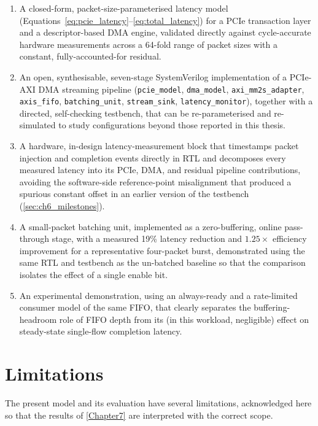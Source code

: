 \begin{enumerate}
    \item A closed-form, packet-size-parameterised latency model (Equations~\ref{eq:pcie_latency}--\ref{eq:total_latency}) for a PCIe transaction layer and a descriptor-based DMA engine, validated directly against cycle-accurate hardware measurements across a 64-fold range of packet sizes with a constant, fully-accounted-for residual.
    \item An open, synthesisable, seven-stage SystemVerilog implementation of a PCIe-AXI DMA streaming pipeline (\texttt{pcie\_model}, \texttt{dma\_model}, \texttt{axi\_mm2s\_adapter}, \texttt{axis\_fifo}, \texttt{batching\_unit}, \texttt{stream\_sink}, \texttt{latency\_monitor}), together with a directed, self-checking testbench, that can be re-parameterised and re-simulated to study configurations beyond those reported in this thesis.
    \item A hardware, in-design latency-measurement block that timestamps packet injection and completion events directly in RTL and decomposes every measured latency into its PCIe, DMA, and residual pipeline contributions, avoiding the software-side reference-point misalignment that produced a spurious constant offset in an earlier version of the testbench (\autoref{sec:ch6_milestones}).
    \item A small-packet batching unit, implemented as a zero-buffering, online pass-through stage, with a measured 19\% latency reduction and $1.25\times$ efficiency improvement for a representative four-packet burst, demonstrated using the same RTL and testbench as the un-batched baseline so that the comparison isolates the effect of a single enable bit.
    \item An experimental demonstration, using an always-ready and a rate-limited consumer model of the same FIFO, that clearly separates the buffering-headroom role of FIFO depth from its (in this workload, negligible) effect on steady-state single-flow completion latency.
\end{enumerate}

\section{Limitations}
\label{sec:ch8_limitations}

The present model and its evaluation have several limitations, acknowledged here so that the results of \autoref{Chapter7} are interpreted with the correct scope.

